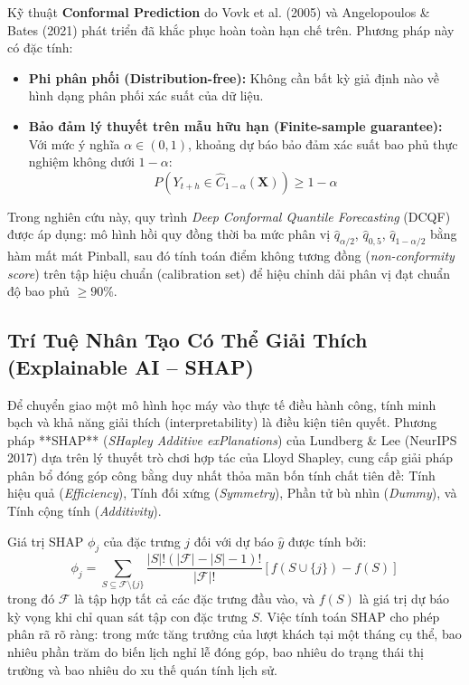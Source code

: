 Kỹ thuật \textbf{Conformal Prediction} do Vovk et al. (2005) \cite{vovk2005algorithmic} và Angelopoulos \& Bates (2021) \cite{angelopoulos2021conformal} phát triển đã khắc phục hoàn toàn hạn chế trên. Phương pháp này có đặc tính:
\begin{itemize}
    \item \textbf{Phi phân phối (Distribution-free):} Không cần bất kỳ giả định nào về hình dạng phân phối xác suất của dữ liệu.
    \item \textbf{Bảo đảm lý thuyết trên mẫu hữu hạn (Finite-sample guarantee):} Với mức ý nghĩa $\alpha \in (0, 1)$, khoảng dự báo bảo đảm xác suất bao phủ thực nghiệm không dưới $1 - \alpha$:
    \begin{equation}
        P\left( Y_{t+h} \in \hat{C}_{1-\alpha}(\mathbf{X}) \right) \ge 1 - \alpha
    \end{equation}
\end{itemize}
Trong nghiên cứu này, quy trình \textit{Deep Conformal Quantile Forecasting} (DCQF) được áp dụng: mô hình hồi quy đồng thời ba mức phân vị $\hat{q}_{\alpha/2}$, $\hat{q}_{0{,}5}$, $\hat{q}_{1-\alpha/2}$ bằng hàm mất mát Pinball, sau đó tính toán điểm không tương đồng (\textit{non-conformity score}) trên tập hiệu chuẩn (calibration set) để hiệu chỉnh dải phân vị đạt chuẩn độ bao phủ $\ge 90\%$.

\subsection{Trí Tuệ Nhân Tạo Có Thể Giải Thích (Explainable AI -- SHAP)}
Để chuyển giao một mô hình học máy vào thực tế điều hành công, tính minh bạch và khả năng giải thích (interpretability) là điều kiện tiên quyết. Phương pháp **SHAP** (\textit{SHapley Additive exPlanations}) của Lundberg \& Lee (NeurIPS 2017) \cite{lundberg2017shap} dựa trên lý thuyết trò chơi hợp tác của Lloyd Shapley, cung cấp giải pháp phân bổ đóng góp công bằng duy nhất thỏa mãn bốn tính chất tiên đề: Tính hiệu quả (\textit{Efficiency}), Tính đối xứng (\textit{Symmetry}), Phần tử bù nhìn (\textit{Dummy}), và Tính cộng tính (\textit{Additivity}).

Giá trị SHAP $\phi_j$ của đặc trưng $j$ đối với dự báo $\hat{y}$ được tính bởi:
\begin{equation}
    \phi_j = \sum_{S \subseteq \mathcal{F} \setminus \{j\}} \frac{|S|! (|\mathcal{F}| - |S| - 1)!}{|\mathcal{F}|!} \left[ f(S \cup \{j\}) - f(S) \right]
\end{equation}
trong đó $\mathcal{F}$ là tập hợp tất cả các đặc trưng đầu vào, và $f(S)$ là giá trị dự báo kỳ vọng khi chỉ quan sát tập con đặc trưng $S$. Việc tính toán SHAP cho phép phân rã rõ ràng: trong mức tăng trưởng của lượt khách tại một tháng cụ thể, bao nhiêu phần trăm do biến lịch nghỉ lễ đóng góp, bao nhiêu do trạng thái thị trường và bao nhiêu do xu thế quán tính lịch sử.

